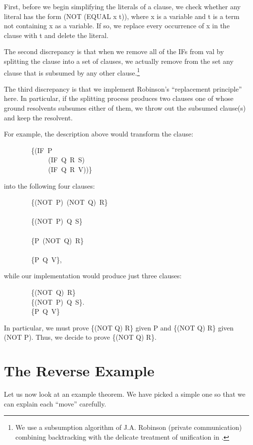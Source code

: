 \documentclass[11pt]{book}
\newenvironment{pubasis}{\begin{flushleft}\ttfamily\small}{\normalsize\rmfamily\end{flushleft}}
\newcommand{\pubdefaulttextsize}{\large}
\begin{document}
First, before we begin simplifying the literals of a clause,
we check whether any literal has the form (NOT (EQUAL x t)),
where x is a variable and t is a term not containing x as a variable.  If
so, we replace every occurrence of x in the clause with t
and delete the literal.

The second discrepancy is that when we  remove all of
the IFs from val by splitting the clause into a set of clauses, we
actually remove from the set any clause that is subsumed by any other clause.\footnote{We use a subsumption algorithm of J.A. Robinson (private communication) combining backtracking with the delicate treatment of unification in \cite{ROBINSON2}.}  

The third discrepancy is that we implement
Robinson's ``replacement principle'' \cite{ROBINSON} here.  In particular, if
the splitting process produces two clauses one of  whose ground resolvents subsumes either
of them, we throw out the subsumed clause(s) and keep the resolvent.

For example, the description above would transform the clause:
\begin{pubasis}
~~~~~~~~\{(IF~P\\
~~~~~~~~~~~~~(IF~Q~R~S)\\
~~~~~~~~~~~~~(IF~Q~R~V))\}\\
\end{pubasis}
into the following four clauses:
\begin{pubasis}
~~~~~~~~\{(NOT~P)~(NOT~Q)~R\}\\
~~~\\
~~~~~~~~\{(NOT~P)~Q~S\}\\
~~~\\
~~~~~~~~\{P~(NOT~Q)~R\}\\
~~~\\
~~~~~~~~\{P~Q~V\},\\
\end{pubasis}
while our implementation would produce just three clauses:
\begin{pubasis}
~~~~~~~~\{(NOT~Q)~R\}\\

~~~~~~~~\{(NOT~P)~Q~S\}.\\

~~~~~~~~\{P~Q~V\}\\
\end{pubasis}
In particular, 
we must prove \{(NOT Q) R\}
given P and \{(NOT Q) R\} given (NOT P).  Thus, we decide to prove 
\{(NOT Q) R\}.
\section{The Reverse Example}
\pubdefaulttextsize
Let us now look at an example theorem.  We have picked a
simple one so that we can explain each ``move'' carefully.
\end{document}
